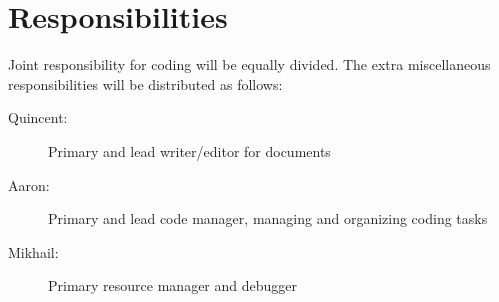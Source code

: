 \documentclass[11pt]{article}
\begin{document}
\section{Responsibilities}
Joint responsibility for coding will be equally divided. The extra miscellaneous responsibilities will be distributed as follows:
\begin{description}
 \item[Quincent: ]Primary and lead writer/editor for documents
 \item[Aaron: ]Primary and lead code manager, managing and organizing coding tasks
 \item[Mikhail: ]Primary resource manager and debugger
\end{description}
\end{document}
